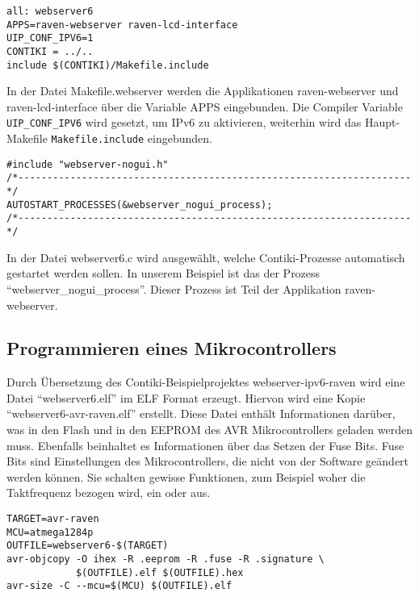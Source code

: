 \begin{lstlisting}[caption=Auszug aus examples/webserver-ipv6-raven/Makefile.webserver]
all: webserver6
APPS=raven-webserver raven-lcd-interface
UIP_CONF_IPV6=1
CONTIKI = ../..
include $(CONTIKI)/Makefile.include
\end{lstlisting}

In der Datei Makefile.webserver werden die Applikationen raven-webserver und raven-lcd-interface über die Variable APPS eingebunden. Die Compiler Variable \texttt{UIP\_CONF\_IPV6} wird gesetzt, um IPv6 zu aktivieren, weiterhin wird das Haupt-Makefile \texttt{Makefile.include} eingebunden.

\begin{lstlisting}[caption=Auszug aus examples/webserver-ipv6-raven/webserver6.c]
#include "webserver-nogui.h"
/*--------------------------------------------------------------------*/
AUTOSTART_PROCESSES(&webserver_nogui_process);
/*--------------------------------------------------------------------*/
\end{lstlisting}

In der Datei webserver6.c wird ausgewählt, welche Contiki-Prozesse automatisch gestartet werden sollen. In unserem Beispiel ist das der Prozess "`webserver\_nogui\_process"'. Dieser Prozess ist Teil der Applikation raven-webserver.



\subsection{Programmieren eines Mikrocontrollers}


Durch Übersetzung des Contiki-Beispielprojektes webserver-ipv6-raven wird eine Datei "`webserver6.elf"' im ELF Format erzeugt. Hiervon wird eine Kopie "`webserver6-avr-raven.elf"' erstellt. Diese Datei enthält Informationen darüber, was in den Flash und in den EEPROM des AVR Mikrocontrollers geladen werden muss. Ebenfalls beinhaltet es Informationen über das Setzen der Fuse Bits. Fuse Bits sind Einstellungen des Mikrocontrollers, die nicht von der Software geändert werden können. Sie schalten gewisse Funktionen, zum Beispiel woher die Taktfrequenz bezogen wird, ein oder aus.

\begin{lstlisting}[caption=Auszug aus examples/webserver-ipv6-raven/Makefile]
TARGET=avr-raven
MCU=atmega1284p
OUTFILE=webserver6-$(TARGET)
avr-objcopy -O ihex -R .eeprom -R .fuse -R .signature \
            $(OUTFILE).elf $(OUTFILE).hex
avr-size -C --mcu=$(MCU) $(OUTFILE).elf
\end{lstlisting}

